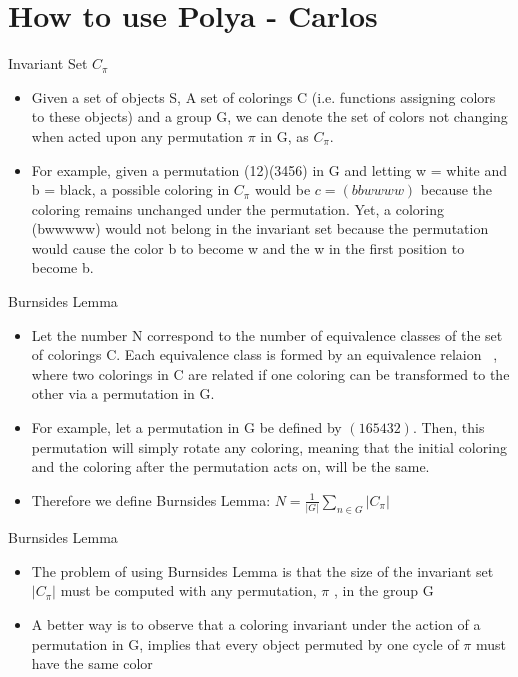 \documentclass{beamer}
\begin{document}
\section{How to use Polya - Carlos}

\begin{frame}{Invariant Set $C_{\pi}$}
\begin{itemize}
\item Given a set of objects S, A set of colorings C (i.e. functions assigning colors to these objects) and a group G, we can denote the set of colors not changing when acted upon any permutation ${\pi}$ in G, as $C_{\pi}$.
\item For example, given a permutation (12)(3456) in G and letting w = white and b = black, a possible coloring in $C_{\pi}$ would be $c =(bbwwww)$ because the coloring remains unchanged under the permutation. Yet, a coloring (bwwwww) would not belong in the invariant set because the permutation would cause the color b to become w and the w in the first position to become b.
\end{itemize}
\end{frame}
%
%
\begin{frame}{Burnsides Lemma}
\begin{itemize}
\item Let the number N correspond to the number of equivalence classes of the set of colorings C. Each equivalence class is formed by an equivalence relaion ~, where two colorings in C are related if one coloring can be  transformed to the other via a permutation in G.
\item For example, let a permutation in G be defined by $(165432)$. Then, this permutation will simply rotate any coloring, meaning that the initial coloring and the coloring after the permutation acts on, will be the same.
\item Therefore we define Burnsides Lemma: $N=\frac{1}{\vert G\vert}{\displaystyle \sum_{n\in G}\vert C_{\pi}\vert}$
\end{itemize}
\end{frame}
%
%
\begin{frame}{Burnsides Lemma}
\begin{itemize}
\item The problem of using Burnsides Lemma is that the size of the invariant set $\vert C_{\pi}\vert$ must be computed with any permutation, $\pi$ , in the group G
\item A better way is to observe that a coloring invariant under the action of a permutation in G, implies that every object permuted by one cycle of $\pi$ must have the same color
\end{itemize}
\end{frame}
\end{document}
